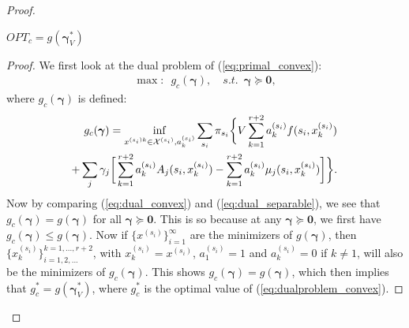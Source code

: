 \documentclass[journal]{IEEEtran}
\newcommand{\bv}[1]{{\boldsymbol{#1} }}
\newcommand{\script}[1]{{{\cal{#1} }}}
\begin{document}
\begin{proof}
\begin{claim}\label{claim:nodualgap}
$OPT_c=g(\bv{\gamma}^*_V)$
\end{claim}
\begin{proof}
We first look at the dual problem of (\ref{eq:primal_convex}):
\begin{eqnarray}
\max: \,\,\,g_c(\bv{\gamma}),\quad s.t. \,\,\, \bv{\gamma}\succeq\bv{0},\label{eq:dualproblem_convex}
\end{eqnarray}
where $g_c(\bv{\gamma})$ is defined:
\begin{eqnarray}
\hspace{-.3in}&&g_c(\bv{\gamma})=\inf_{x^{(s_i)k}\in \script{X}^{(s_i)}, a^{(s_i)}_k}\sum_{s_i}\pi_{s_i}\bigg\{ V\sum_{k=1}^{r+2}a^{(s_i)}_kf(s_i, x^{(s_i)}_k)\label{eq:dual_convex}\\
\hspace{-.3in}&&\quad+\sum_j\gamma_j\bigg[ \sum_{k=1}^{r+2}a^{(s_i)}_kA_j(s_i, x^{(s_i)}_k)- \sum_{k=1}^{r+2}a^{(s_i)}_k\mu_j(s_i, x^{(s_i)}_k)\bigg]\bigg\}.\nonumber
\end{eqnarray}
Now by comparing (\ref{eq:dual_convex}) and (\ref{eq:dual_separable}), we see that $g_c(\bv{\gamma})=g(\bv{\gamma})$ for all $\bv{\gamma}\succeq\bv{0}$. 
This is so because  at any $\bv{\gamma}\succeq\bv{0}$, we first have $g_c(\bv{\gamma})\leq g(\bv{\gamma})$. Now if $\{x^{(s_i)}\}_{i=1}^{\infty}$ are the minimizers of $g(\bv{\gamma})$, then $\{x^{(s_i)}_k\}_{i=1, 2, ...}^{k=1, ..., r+2}$, with $x^{(s_i)}_k=x^{(s_i)}$, $a^{(s_i)}_1=1$ and $a^{(s_i)}_k=0$ if $k\neq1$, will also be the minimizers of $g_c(\bv{\gamma})$. This shows $g_c(\bv{\gamma}) = g(\bv{\gamma})$, which then implies that $g^*_c=g(\bv{\gamma}^*_V)$, where $g^*_c$ is the optimal value of (\ref{eq:dualproblem_convex}). 


\end{proof}
\end{proof}
\end{document}
